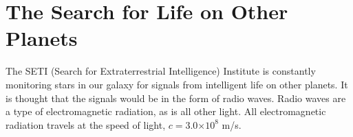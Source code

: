 \documentclass[12pt]{article}%
\providecommand{\e}[1]{\ensuremath{\times 10^{#1}}} %
\begin{document}

%

\clearpage
\section{The Search for Life on Other Planets}
The SETI (Search for Extraterrestrial Intelligence) Institute is constantly monitoring stars in our galaxy for signals from intelligent life on other planets.  
It is thought that the signals would be in the form of radio waves.  
Radio waves are a type of electromagnetic radiation, as is all other light.  
All electromagnetic radiation travels at the speed of light, $c=3.0 \e{8}$ m/s. 
\end{document}
